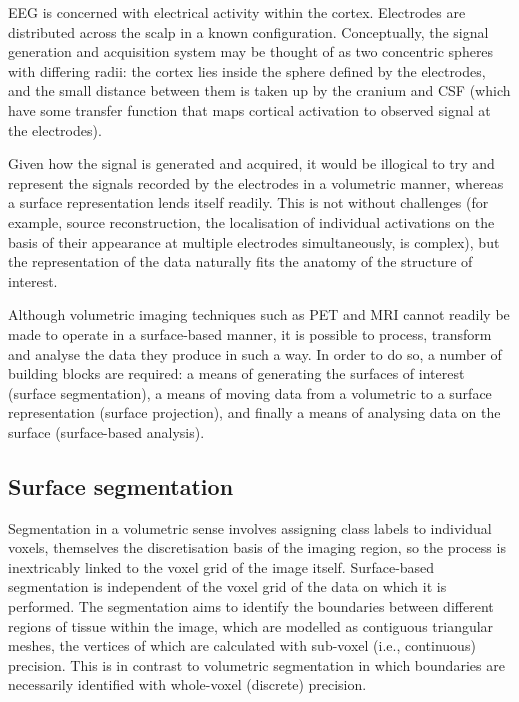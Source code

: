 \documentclass[12pt]{report}
\begin{document}
EEG is concerned with electrical activity within the cortex. Electrodes are distributed across the scalp in a known configuration. Conceptually, the signal generation and acquisition system may be thought of as two concentric spheres with differing radii: the cortex lies inside the sphere defined by the electrodes, and the small distance between them is taken up by the cranium and CSF (which have some transfer function that maps cortical activation to observed signal at the electrodes). 

Given how the signal is generated and acquired, it would be illogical to try and represent the signals recorded by the electrodes in a volumetric manner, whereas a surface representation lends itself readily. This is not without challenges (for example, source reconstruction, the localisation of individual activations on the basis of their appearance at multiple electrodes simultaneously, is complex), but the representation of the data naturally fits the anatomy of the structure of interest. 

Although volumetric imaging techniques such as PET and MRI cannot readily be made to operate in a surface-based manner, it is possible to process, transform and analyse the data they produce in such a way. In order to do so, a number of building blocks are required: a means of generating the surfaces of interest (surface segmentation), a means of moving data from a volumetric to a surface representation (surface projection), and finally a means of analysing data on the surface (surface-based analysis). 

\subsection{Surface segmentation}
\label{surface_segmentation}

Segmentation in a volumetric sense involves assigning class labels to individual voxels, themselves the discretisation basis of the imaging region, so the process is inextricably linked to the voxel grid of the image itself. Surface-based segmentation is independent of the voxel grid of the data on which it is performed. The segmentation aims to identify the boundaries between different regions of tissue within the image, which are modelled as contiguous triangular meshes, the vertices of which are calculated with sub-voxel (i.e., continuous) precision. This is in contrast to volumetric segmentation in which boundaries are necessarily identified with whole-voxel (discrete) precision. 
\end{document}
